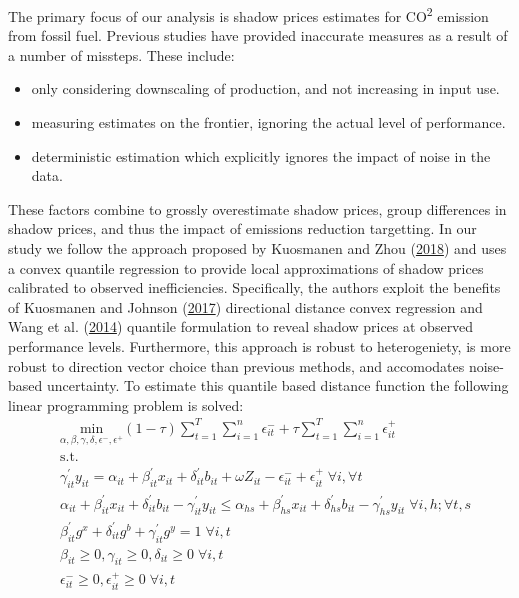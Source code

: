 \documentclass[12pt,]{article}
\providecommand{\tightlist}{%
  \setlength{\itemsep}{0pt}\setlength{\parskip}{0pt}}
\begin{document}
The primary focus of our analysis is shadow prices estimates for CO\textsuperscript{2} emission from fossil fuel. Previous studies have provided inaccurate measures as a result of a number of missteps. These include:

\begin{itemize}
\tightlist
\item
  only considering downscaling of production, and not increasing in input use.
\item
  measuring estimates on the frontier, ignoring the actual level of performance.
\item
  deterministic estimation which explicitly ignores the impact of noise in the data.
\end{itemize}

These factors combine to grossly overestimate shadow prices, group differences in shadow prices, and thus the impact of emissions reduction targetting. In our study we follow the approach proposed by Kuosmanen and Zhou (\protect\hyperlink{ref-Kuosmanen2018b}{2018}) and uses a convex quantile regression to provide local approximations of shadow prices calibrated to observed inefficiencies. Specifically, the authors exploit the benefits of Kuosmanen and Johnson (\protect\hyperlink{ref-Kuosmanen2017}{2017}) directional distance convex regression and Wang et al. (\protect\hyperlink{ref-Wang2014}{2014}) quantile formulation to reveal shadow prices at observed performance levels. Furthermore, this approach is robust to heterogeniety, is more robust to direction vector choice than previous methods, and accomodates noise-based uncertainty. To estimate this quantile based distance function the following linear programming problem is solved:
\begin{equation}
\begin{split}
& \underset{\alpha,\beta,\gamma,\delta,\epsilon^-,\epsilon^+}{\text{min}}
 (1-\tau) \sum^{T}_{t=1} \sum^{n}_{i=1}\epsilon^-_{it} + \tau \sum^{T}_{t=1}  \sum^{n}_{i=1}\epsilon^+_{it}  \\
&\text{s.t.} \\
&\gamma^{'}_{it}y_{it}=\alpha_{it}+\beta^{'}_{it}x_{it}+\delta^{'}_{it}b_{it} + \omega Z_{it} -\epsilon^-_{it}+\epsilon^+_{it} \; \forall i ,\forall t \\
&\alpha_{it}+\beta^{'}_{it}x_{it}+\delta^{'}_{it}b_{it}-\gamma^{'}_{it}y_{it} \leq \alpha_{hs}+\beta^{'}_{hs}x_{it}+\delta^{'}_{hs}b_{it}-\gamma^{'}_{hs}y_{it} \; \forall i,h ; \forall t,s \\
& \beta^{'}_{it}g^x+\delta^{'}_{it}g^b+\gamma^{'}_{it}g^y=1 \; \forall i,t\\
& \beta_{it} \geq0,\gamma_{it} \geq0,\delta_{it} \geq0 \; \forall i,t \\
& \epsilon^-_{it} \geq0, \epsilon^+_{it} \geq 0 \; \forall i,t
\end{split}
\label{eq:QCNLS}
\end{equation}
\end{document}
